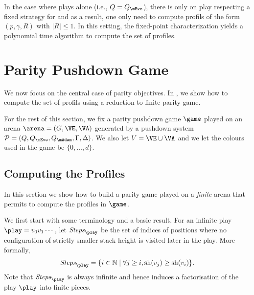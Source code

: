 \begin{remark}
In the case where \Eve plays alone (i.e., $Q=Q_\mEve$), there is only on play respecting a fixed strategy for \Eve and as a result, one only need to compute profils of the form $(p,\gamma,R)$ with $|R|\leq 1$. In this setting, the fixed-point characterization yields a polynomial time algorithm to compute the set of profiles.
\end{remark}







\section{Parity Pushdown Game}

We now focus on the central case of parity objectives. In , we show how to compute the set of profils using a reduction to finite parity game.

For the rest of this section, we fix a parity pushdown game $\game$ played on an arena $\arena = (G,\VE,\VA)$ generated by a pushdown system $\PDS = (Q,Q_{\mEve}, Q_{\mAdam}, \Gamma,\Delta)$. We also let $V=\VE\cup\VA$ and we let the colours used in the game be $\{0,\dots,d\}$.


\subsection{Computing the Profiles}\label{11-section:computing-profiles}


In this section we show how to build a parity game played on a \emph{finite} arena that permits to compute the profiles in $\game$. 

We first start with some terminology and a basic result. For an infinite play $\play=v_0v_1\cdots$, let
$\Stepsg{\play}$ be the set of indices of positions where no
configuration of strictly smaller stack height is visited later in the
play. More formally, $$\Stepsg{\play}=\{i\in\mathbb{N}\mid \forall
j\geq i, \sh(v_j)\geq \sh(v_i)\}.$$ Note that $\Stepsg{\play}$ is always
infinite and hence induces a factorisation of the play $\play$ into
finite pieces.


